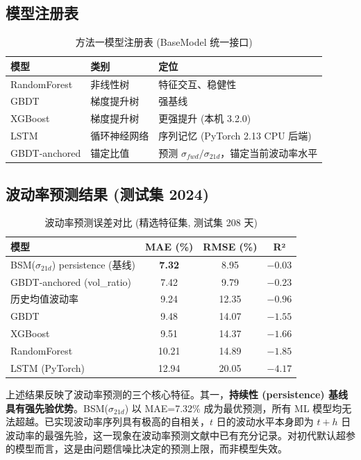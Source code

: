 \documentclass[a4paper,11pt]{article}
\begin{document}
\subsection{模型注册表}

\begin{table}[H]
\centering
\caption{方法一模型注册表 (BaseModel 统一接口)}
\label{tab:a1_models}
\begin{tabular}{lll}
\toprule
\textbf{模型} & \textbf{类别} & \textbf{定位} \\
\midrule
RandomForest & 非线性树 & 特征交互、稳健性 \\
GBDT & 梯度提升树 & 强基线 \\
XGBoost & 梯度提升树 & 更强提升 (本机 3.2.0) \\
LSTM & 循环神经网络 & 序列记忆 (PyTorch 2.13 CPU 后端) \\
GBDT-anchored & 锚定比值 & 预测 $\sigma_{fwd}/\sigma_{21d}$，锚定当前波动率水平 \\
\bottomrule
\end{tabular}
\end{table}

\subsection{波动率预测结果 (测试集 2024)}

\begin{table}[H]
\centering
\caption{波动率预测误差对比 (精选特征集, 测试集 208 天)}
\label{tab:a1_vol}
\begin{tabular}{lccc}
\toprule
\textbf{模型} & \textbf{MAE (\%)} & \textbf{RMSE (\%)} & \textbf{R²} \\
\midrule
BSM($\sigma_{21d}$) persistence (基线) & \textbf{7.32} & 8.95 & $-0.03$ \\
GBDT-anchored (vol\_ratio) & 7.42 & 9.79 & $-0.23$ \\
历史均值波动率 & 9.24 & 12.35 & $-0.96$ \\
GBDT & 9.48 & 14.07 & $-1.55$ \\
XGBoost & 9.51 & 14.37 & $-1.66$ \\
RandomForest & 10.21 & 14.89 & $-1.85$ \\
LSTM (PyTorch) & 12.94 & 20.05 & $-4.17$ \\
\bottomrule
\end{tabular}
\end{table}

上述结果反映了波动率预测的三个核心特征。其一，\textbf{持续性 (persistence) 基线具有强先验优势}。BSM($\sigma_{21d}$) 以 MAE=7.32\% 成为最优预测，所有 ML 模型均无法超越。已实现波动率序列具有极高的自相关，$t$ 日的波动水平本身即为 $t{+}h$ 日波动率的最强先验，这一现象在波动率预测文献中已有充分记录。对初代默认超参的模型而言，这是由问题信噪比决定的预测上限，而非模型失效。
\end{document}
